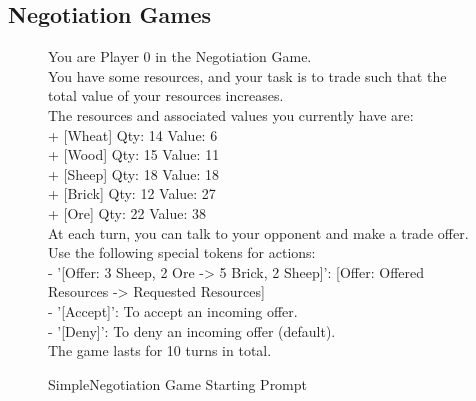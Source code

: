 \subsection{Negotiation Games}


\begin{figure}[H]
\centering  
\begin{tcolorbox}[
    colback=blue!5!white,
    colframe=blue!40!white,
    left=0.8mm, right=0.8mm, top=0.8mm, bottom=0.8mm,
    boxsep=0.8mm,
    width=\textwidth,
    enhanced,
    breakable,
    attach boxed title to top center={yshift=-2mm},
    boxed title style={colback=blue!40!white},
     title={SimpleNegotiation Game Starting Prompt},
    fontupper=\footnotesize,
    fonttitle=\footnotesize,
    label=box:simpleNegotiation
]
You are Player 0 in the Negotiation Game.\\
You have some resources, and your task is to trade such that the total value of your resources increases.\\
The resources and associated values you currently have are:\\
        \hspace*{2em}+ [Wheat]   Qty: 14   Value: 6\\
        \hspace*{2em}+ [Wood]    Qty: 15   Value: 11\\
        \hspace*{2em}+ [Sheep]   Qty: 18   Value: 18\\
        \hspace*{2em}+ [Brick]   Qty: 12   Value: 27\\
        \hspace*{2em}+ [Ore]     Qty: 22   Value: 38\\
At each turn, you can talk to your opponent and make a trade offer.\\
Use the following special tokens for actions:\\
  \hspace*{1em}- '[Offer: 3 Sheep, 2 Ore -\textgreater{} 5 Brick, 2 Sheep]': [Offer: Offered Resources -\textgreater{} Requested Resources]\\
  \hspace*{1em}- '[Accept]': To accept an incoming offer.\\
  \hspace*{1em}- '[Deny]': To deny an incoming offer (default).\\
The game lasts for 10 turns in total.\\
\end{tcolorbox}

\caption{SimpleNegotiation Game Starting Prompt} \label{fig:simpleNegotiation}
\end{figure}


